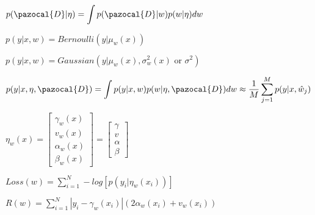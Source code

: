 \documentclass[multi={mymath},border=1pt]{standalone}
\newenvironment{mymath}{$\displaystyle}{$}
\begin{document}
	\begin{mymath}\label{eq:marginal:likelihood}
		p(\pazocal{D}|\eta) = \int p(\pazocal{D}|w)p(w|\eta) dw
	\end{mymath}
	
	\begin{mymath}\label{eq:class:likelihood}
		p(y|x, w) = Bernoulli(y|\mu_w(x))
	\end{mymath}
	
	\begin{mymath}\label{eq:regression:likelihood}
		p(y|x, w) = Gaussian(y|\mu_w(x), \sigma^2_w(x) \text{ or }  \sigma^2)
	\end{mymath}
	
	\begin{mymath}\label{eq:posterior:predictive:mc}
		p(y|x, \eta, \pazocal{D}) = \int p(y|x, w)p(w|\eta, \pazocal{D}) dw \approx 
		\frac{1}{M}\sum_{j = 1}^{M}p(y|x, \hat{w}_j)
	\end{mymath}
	
	\begin{mymath}
		\eta_w(x) = \begin{bmatrix}
			\gamma_w(x) \\ v_w(x) \\ \alpha_w(x) \\ \beta_w(x)
		\end{bmatrix}
		= \begin{bmatrix}
			\gamma \\ v \\ \alpha \\ \beta
		\end{bmatrix}
	\end{mymath}
	
	\begin{mymath}\label{eq:evidential:loss}
		Loss(w) = \sum_{i=1}^{N} -log [p(y_i|\eta_w(x_i))]
	\end{mymath}
	
	\begin{mymath}\label{eq:evidential:regularizer}
		R(w) = \sum_{i=1}^{N}|y_i-\gamma_w(x_i)|(2\alpha_w(x_i) + v_w(x_i))
	\end{mymath}
	
	
\end{document}
